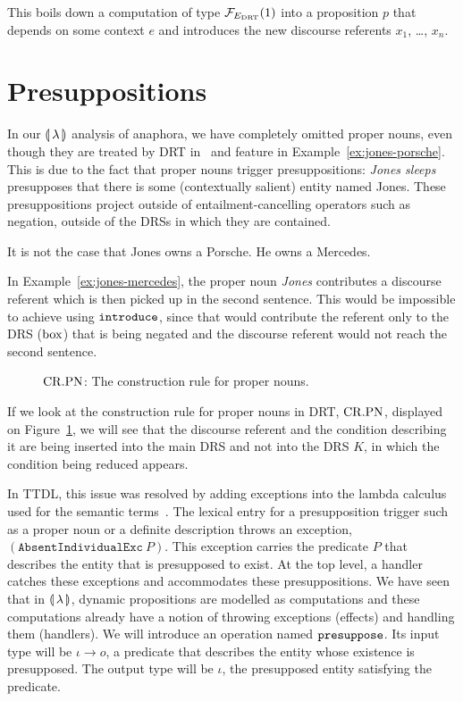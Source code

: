 This boils down a computation of type $\mathcal{F}_{E_{\mathrm{DRT}}}(1)$ into a proposition
$p$ that depends on some context $e$ and introduces the new discourse
referents $x_1$, \ldots, $x_n$.


\section{Presuppositions}
\label{sec:presuppositions}

In our $\llparenthesis \, \lambda \, \rrparenthesis$ analysis of anaphora, we have completely omitted
proper nouns, even though they are treated by DRT
in~\cite{kamp1993discourse} and feature in
Example~\ref{ex:jones-porsche}. This is due to the fact that proper nouns
trigger presuppositions: \emph{Jones sleeps} presupposes that there is some
(contextually salient) entity named Jones. These presuppositions project
outside of entailment-cancelling operators such as negation, outside of the
DRSs in which they are contained.

\begin{exe}
  \ex \label{ex:jones-mercedes} It is not the case that Jones owns a
  Porsche. He owns a Mercedes.
\end{exe}

In Example~\ref{ex:jones-mercedes}, the proper noun \emph{Jones}
contributes a discourse referent which is then picked up in the second
sentence. This would be impossible to achieve using $\mathtt{introduce}$, since
that would contribute the referent only to the DRS ($\mathrm{box}$) that is being
negated and the discourse referent would not reach the second sentence.

\begin{figure}
\centering
\crpnbox
\caption{\label{fig:crpn} $\mathrm{CR.PN}$: The construction rule for proper nouns.}
\end{figure}

If we look at the construction rule for proper nouns in DRT, $\mathrm{CR.PN}$,
displayed on Figure~\ref{fig:crpn}, we will see that the discourse referent
and the condition describing it are being inserted into the main DRS and
not into the DRS $K$, in which the condition being reduced appears.

In TTDL, this issue was resolved by adding exceptions into the lambda
calculus used for the semantic terms~\cite{lebedeva2012expression}. The
lexical entry for a presupposition trigger such as a proper noun or a
definite description throws an exception,
$(\texttt{AbsentIndividualExc}\ P)$. This exception carries the predicate
$P$ that describes the entity that is presupposed to exist. At the top
level, a handler catches these exceptions and accommodates these
presuppositions. We have seen that in $\llparenthesis \, \lambda \, \rrparenthesis$, dynamic
propositions are modelled as computations and these computations already
have a notion of throwing exceptions (effects) and handling them
(handlers). We will introduce an operation named $\mathtt{presuppose}$. Its
input type will be $\iota \to o$, a predicate that describes the entity
whose existence is presupposed. The output type will be $\iota$, the
presupposed entity satisfying the predicate.

